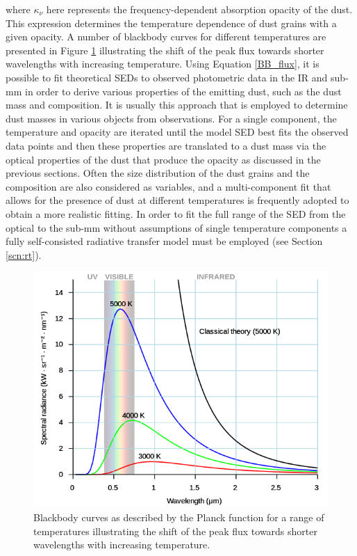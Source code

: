 \noindent where $\kappa_{\nu}$ here represents the frequency-dependent absorption opacity of the dust.  This expression determines the temperature dependence of dust grains with a given opacity.  A number of blackbody curves for different temperatures are presented in Figure \ref{BB} illustrating the shift of the peak flux towards shorter wavelengths with increasing temperature.  Using Equation \ref{BB_flux}, it is possible to fit theoretical SEDs to  observed photometric data in the IR and sub-mm in order to derive various properties of the emitting dust, such as the dust mass and composition.  It is usually this approach that is employed to determine dust masses in various objects from observations.  For a single component, the temperature and opacity are iterated until the model SED best fits the observed data points and then these properties are translated to a dust mass via the optical properties of the dust that produce the opacity as discussed in the previous sections.  Often the size distribution of the dust grains and the composition are also considered as variables, and a multi-component fit that allows for the presence of dust at different temperatures is frequently adopted to obtain a  more realistic fitting.  In order to fit  the full range of the SED from the optical to the sub-mm without assumptions of single temperature components  a fully self-consisted radiative transfer model must be employed (see Section \ref{scn:rt}).

\begin{figure}
\centering
\includegraphics[clip=true,scale=0.6,trim= 0 0 0 0]{chapters/chapter1/figs/BB_curves.png}
\caption{Blackbody curves as described by the Planck function for a range of temperatures illustrating the shift of the peak flux towards shorter wavelengths with increasing temperature.}
\label{BB}
\end{figure}



